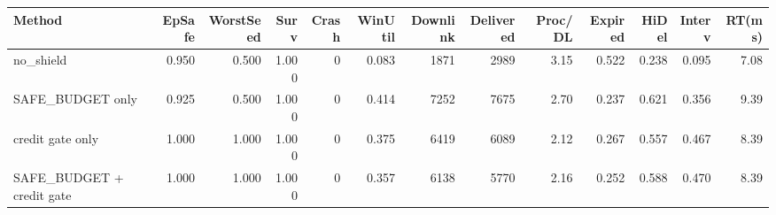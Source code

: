 \begin{tabular}{lrrrrrrrrrrrr}
\hline
Method & EpSafe & WorstSeed & Surv & Crash & WinUtil & Downlink & Delivered & Proc/DL & Expired & HiDel & Interv & RT(ms) \\
\hline
no\_shield & 0.950 & 0.500 & 1.000 & 0 & 0.083 & 1871 & 2989 & 3.15 & 0.522 & 0.238 & 0.095 & 7.08 \\
SAFE\_BUDGET only & 0.925 & 0.500 & 1.000 & 0 & 0.414 & 7252 & 7675 & 2.70 & 0.237 & 0.621 & 0.356 & 9.39 \\
credit gate only & 1.000 & 1.000 & 1.000 & 0 & 0.375 & 6419 & 6089 & 2.12 & 0.267 & 0.557 & 0.467 & 8.39 \\
SAFE\_BUDGET + credit gate & 1.000 & 1.000 & 1.000 & 0 & 0.357 & 6138 & 5770 & 2.16 & 0.252 & 0.588 & 0.470 & 8.39 \\
\hline
\end{tabular}
